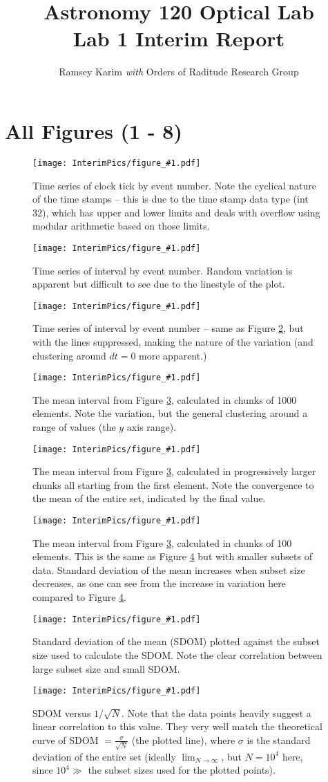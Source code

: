\documentclass{article}
\title{Astronomy 120 Optical Lab \\ Lab 1 Interim Report}
\author{Ramsey Karim {\small \sl with} Orders of Raditude Research Group}
\newcommand{\quickfig}[2]{
	\begin{figure}[th]
		\centering
		\texttt{[image: InterimPics/figure\_\#1.pdf]}
		\caption{\label{fig:f#1}#2}
	\end{figure}
}
\begin{document}
\maketitle
{}


\section{All Figures (1 - 8)}
\quickfig{1}{Time series of clock tick by event number. Note the cyclical nature of the time stamps
	 -- this is due to the time stamp data type (int 32), which has upper and lower limits and
	 deals with overflow using modular arithmetic based on those limits.}
\quickfig{2}{Time series of interval by event number. Random variation is apparent but difficult
	to see due to the linestyle of the plot.}
\quickfig{3}{Time series of interval by event number -- same as Figure \ref{fig:f2}, but with the lines suppressed,
	making the nature of the variation (and clustering around $dt = 0$ more apparent.)}
\quickfig{4}{The mean interval from Figure \ref{fig:f3}, calculated in chunks of 1000 elements. Note the variation, but the
	general clustering around a range of values (the $y$ axis range).}
\quickfig{5}{The mean interval from Figure \ref{fig:f3}, calculated in progressively larger chunks all starting
	from the first element. Note the convergence to the mean of the entire set, indicated by the final value.}
\quickfig{6}{The mean interval from Figure \ref{fig:f3}, calculated in chunks of 100 elements. This is the same as
	Figure \ref{fig:f4} but with smaller subsets of data. Standard deviation of the mean increases when subset
	size decreases, as one can see from the increase in variation here compared to Figure \ref{fig:f4}.}
\quickfig{7}{Standard deviation of the mean (SDOM) plotted against the subset size used to calculate the SDOM.
	Note the clear correlation between large subset size and small SDOM.}
\quickfig{8}{SDOM versus $1/\sqrt{N}$. Note that the data points heavily suggest a linear correlation to this value.
	They very well match the theoretical curve of SDOM $= \frac{\sigma}{\sqrt{N}}$ (the plotted line), where $\sigma$ is the standard
	deviation of the entire set (ideally $\lim_{N \to \infty}$, but $N = 10^4$ here, since $10^4 \gg$ the subset sizes
	used for the plotted points).}
\end{document}
